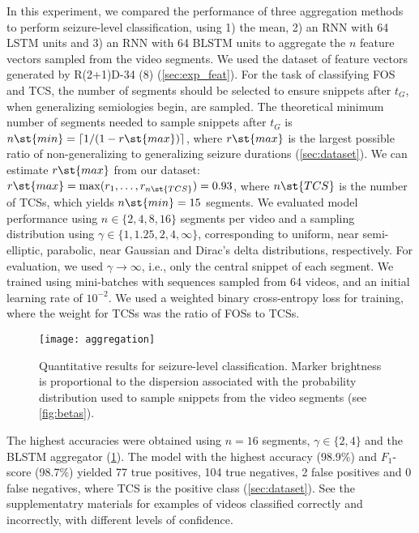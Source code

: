 In this experiment, we compared the performance of three aggregation methods to perform seizure-level classification, using 1) the mean, 2) an \ac{RNN} with 64 \ac{LSTM} units and 3) an \ac{RNN} with 64 \ac{BLSTM} units to aggregate the $n$ feature vectors sampled from the video segments.
We used the dataset of feature vectors generated by R(2+1)D-34 (8) (\cref{sec:exp_feat}).
For the task of classifying \ac{FOS} and \ac{TCS}, the number of segments should be
selected to ensure snippets after $t_G$, when generalizing semiologies begin, are sampled.
The theoretical minimum number of segments needed to sample snippets after $t_G$ is $n\st{min} = \lceil 1 / (1 - r\st{max}) \rceil $,
where $r\st{max}$ is the largest possible ratio of non-generalizing to generalizing seizure durations (\cref{sec:dataset}).
We can estimate $r\st{max}$ from our dataset:
$r\st{max} = \max ( r_1, \dots, r_{n\st{TCS}} ) = 0.93$, where $n\st{TCS}$ is the number of \acp{TCS},
which yields $n\st{min} = 15$ segments.
We evaluated model performance using $n \in \{2, 4, 8, 16\}$ segments per video and a sampling distribution using $\gamma \in \{ 1, 1.25, 2, 4, \infty \}$, corresponding to uniform, near semi-elliptic, parabolic, near Gaussian and Dirac's delta distributions, respectively.
For evaluation, we used $\gamma \rightarrow \infty$, i.e., only the central snippet of each segment.
We trained using mini-batches with sequences sampled from 64 videos, and an initial learning rate of $10 ^ {-2}$.
We used a weighted binary cross-entropy loss for training,
where the weight for \acp{TCS} was the ratio of \acp{FOS} to \acp{TCS}.


\begin{figure}[b!]
    \centering
    \texttt{[image: aggregation]}
    \caption{%
        Quantitative results for seizure-level classification.
        Marker brightness is proportional to the dispersion associated with the probability distribution used to sample snippets from the video segments (see \cref{fig:betas}).
    }
    \label{fig:aggregation}
\end{figure}

The highest accuracies were obtained using $n = 16$ segments, $\gamma \in \{ 2, 4 \}$ and the \ac{BLSTM} aggregator (\cref{fig:aggregation}).
The model with the highest accuracy (98.9\%) and $F_1$-score (98.7\%) yielded 77 true positives, 104 true negatives, 2 false positives and 0 false negatives, where \ac{TCS} is the positive class (\cref{sec:dataset}). See the supplementatry materials for examples of videos classified correctly and incorrectly, with different levels of confidence.



